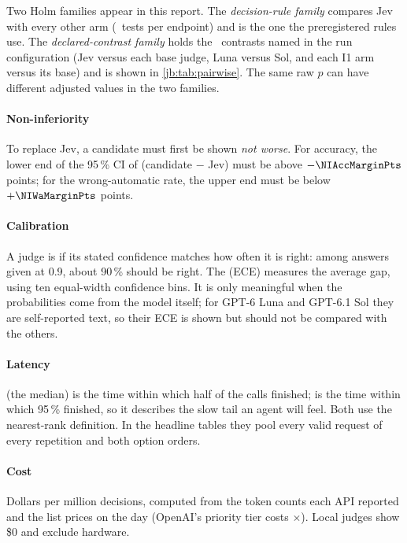 Two Holm families appear in this report. The \emph{decision-rule family} compares Jev with every other
arm (\RuleOneFamilyHold\ tests per endpoint) and is the one the preregistered rules use. The
\emph{declared-contrast family} holds the \HoldPairwiseFamily\ contrasts named in the run configuration
(Jev versus each base judge, Luna versus Sol, and each I1 arm versus its base) and is shown in
\cref{jb:tab:pairwise}. The same raw $p$ can have different adjusted values in the two families.

\paragraph{Non-inferiority} To replace Jev, a candidate must first be shown \emph{not worse}. For
accuracy, the lower end of the 95\,\% CI of (candidate $-$ Jev) must be above $-\NIAccMarginPts$ points;
for the wrong-automatic rate, the upper end must be below $+\NIWaMarginPts$ points.

\paragraph{Calibration} A judge is  if its stated confidence matches how often it is
right: among answers given at 0.9, about 90\,\% should be right. The 
(ECE) measures the average gap, using ten equal-width confidence bins. It is only meaningful when the
probabilities come from the model itself; for GPT-6 Luna and GPT-6.1 Sol they are self-reported text,
so their ECE is shown but should not be compared with the others.

\paragraph{Latency}  (the median) is the time within which half of the calls finished;
 is the time within which 95\,\% finished, so it describes the slow tail an agent will feel.
Both use the nearest-rank definition. In the headline tables they pool every valid request of every
repetition and both option orders.

\paragraph{Cost} Dollars per million decisions, computed from the token counts each API reported and
the list prices on the day (OpenAI's priority tier costs \PriorityMultiplier$\times$). Local judges
show \$0 and exclude hardware.

